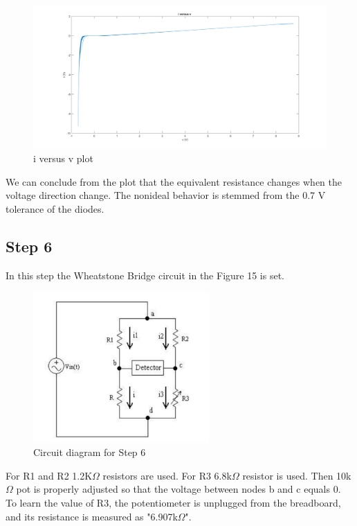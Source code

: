 \documentclass[letterpaper,12pt]{article}
\begin{document}
\begin{figure}[H]
	\centering
   \includegraphics[width=1\textwidth]{5b.png}
   \caption{i versus v plot}
\end{figure}  
We can conclude from the plot that the equivalent resistance changes when the voltage direction change. The nonideal behavior is stemmed from the 0.7 V tolerance of the diodes.


\subsection{Step 6}
In this step the Wheatstone Bridge circuit in the Figure 15 is set.  
\begin{figure}[H]
	\centering
   \includegraphics[width=0.6\textwidth]{6.png}
   \caption{Circuit diagram for Step 6}
\end{figure}  
For R1 and R2 1.2K\(\Omega\) resistors are used. For R3 6.8k\(\Omega\) resistor is used. Then 10k\(\Omega\) pot is properly adjusted so that the voltage between nodes b and c equals 0. To learn the value of R3, the potentiometer is unplugged from the breadboard, and its resistance is measured as "6.907k\(\Omega\)".
\end{document}
